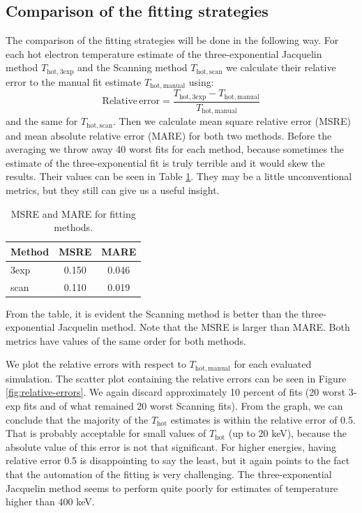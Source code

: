 \subsection*{Comparison of the fitting strategies}
The comparison of the fitting strategies will be done in the following way. For each hot electron temperature estimate of the three-exponential Jacquelin method $T_\mathrm{hot,3exp}$ and the Scanning method $T_\mathrm{hot,scan}$ we calculate their relative error to the manual fit estimate $T_\mathrm{hot,manual}$ using:
\begin{equation}
	\mathrm{Relative \, error} = \frac{T_\mathrm{hot,3exp}-T_\mathrm{hot,manual}}{T_\mathrm{hot,manual}}
\end{equation}
and the same for $T_\mathrm{hot,scan}$. Then we calculate mean square relative error (MSRE) and mean absolute relative error (MARE) for both two methods. Before the averaging we throw away 40 worst fits for each method, because sometimes the estimate of the three-exponential fit is truly terrible and it would skew the results. Their values can be seen in Table \ref{tab:means_mses}. They may be a little unconventional metrics, but they still can give us a useful insight. 

\begin{table}[ht]
	\centering
	\caption{MSRE and MARE for fitting methods.}
	\begin{tabular}{lcc}
		\toprule
		Method & MSRE & MARE \\
		\midrule
		3exp  & 0.150 & 0.046 \\
		scan  & 0.110  & 0.019 \\
		\bottomrule
	\end{tabular}
	
	\label{tab:means_mses}
\end{table}

From the table, it is evident the Scanning method is better than the three-exponential Jacquelin method. Note that the MSRE is larger than MARE. Both metrics have values of the same order for both methods.

We plot the relative errors with respect to $T_\mathrm{hot,manual}$ for each evaluated simulation. The scatter plot containing the relative errors can be seen in Figure \ref{fig:relative-errors}. We again discard approximately 10 percent of fits (20 worst 3-exp fits and of what remained 20 worst Scanning fits). From the graph, we can conclude that the majority of the $T_\mathrm{hot}$ estimates is within the relative error of 0.5. That is probably acceptable for small values of $T_\mathrm{hot}$ (up to 20 keV), because the absolute value of this error is not that significant. For higher energies, having relative error 0.5 is disappointing to say the least, but it again points to the fact that the automation of the fitting is very challenging. The three-exponential Jacquelin method seems to perform quite poorly for estimates of temperature higher than 400 keV.

